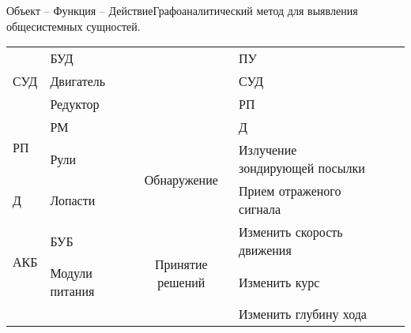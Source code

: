 \begin{frame}{Объект -- Функция -- Действие}{\small Графоаналитический метод для выявления общесистемных сущностей.}
\begin{tabular}{cp{}||c|p{}||cp{}}
        \multicolumn{1}{|l|}{\multirow{3}{*}{СУД}} & БУД                                         &                                    & ПУ                               &                                           &                                           \\ \cline{2-2} \cline{4-4}
        \multicolumn{1}{|l|}{}                     & Двигатель                                   &                                    & СУД                              &                                           &                                           \\ \cline{2-2} \cline{4-4}
        \multicolumn{1}{|l|}{}                     & Редуктор                                    &                                    & РП                               &                                           &                                           \\ \cline{1-2} \cline{4-4}
        \multicolumn{1}{|l|}{\multirow{2}{*}{РП}}  & РМ                                          &                                    & Д                                &                                           &                                           \\ \cline{2-4}
        \multicolumn{1}{|l|}{}                     & Рули                                        & \multirow{2}{*}{Обнаружение}       & Излучение зондирующей посылки    &                                           &                                           \\ \cline{1-2} \cline{4-4}
        \multicolumn{1}{|l|}{Д}                    & Лопасти                                     &                                    & Прием отраженого сигнала         &                                           &                                           \\ \cline{1-4}
        \multicolumn{1}{|l|}{\multirow{2}{*}{АКБ}} & БУБ                                         & \multirow{4}{*}{Принятие решений}  & Изменить скорость движения       &                                           &                                           \\ \cline{2-2} \cline{4-4}
        \multicolumn{1}{|l|}{}                     & Модули питания                              &                                    & Изменить курс                    &                                           &                                           \\ \cline{1-2} \cline{4-4}
                                                   &                                             &                                    & Изменить глубину хода            &                                           &                                           \\ \cline{4-4}

\end{tabular}
\end{frame}
